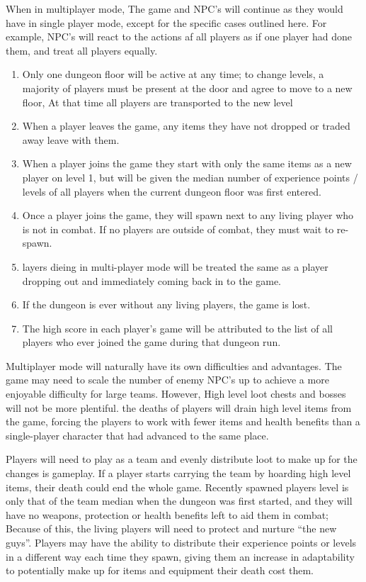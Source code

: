 \documentclass[12pt]{report}
\begin{document}
When in multiplayer mode, The game and NPC's will continue as they would have in single player mode, 
except for the specific cases outlined here. For example, 
NPC's will react to the actions af all players as if one player had done them,
and treat all players equally.
\begin{enumerate}
	\item Only one dungeon floor will be active at any time; to change levels, 
	a majority of players must be present at the door and agree to move to a new floor,
	At that time all players are transported to the new level
	
	\item When a player leaves the game, any items they have not dropped or traded away leave with them.
	
	\item When a player joins the game they start with only the same items as a new player on level 1, 
	but will be given the median number of experience points / levels of all players when the current
	dungeon floor was first entered.
	
	\item Once a player joins the game, they will spawn next to any living player who is not in combat. 
	If no players are outside of combat, they must wait to re-spawn.
	
	\item layers dieing in multi-player mode will be treated the same as a player dropping out 
	and immediately coming back in to the game.
	
	\item If the dungeon is ever without any living players, the game is lost.
	
	\item The high score in each player's game will be attributed to the list of all players 
	who ever joined the game during that dungeon run.
\end{enumerate}
Multiplayer mode will naturally have its own difficulties and advantages. 
The game may need to scale the number of enemy NPC's up to achieve a more enjoyable difficulty for large teams.
However, High level loot chests and bosses will not be more plentiful. 
the deaths of players will drain high level items from the game, forcing the players to work with fewer items and 
health benefits than a single-player character that had advanced to the same place.

Players will need to play as a team and evenly distribute loot to make up for the changes is gameplay.
If a player starts carrying the team by hoarding high level items, their death could end the whole game.
Recently spawned players level is only that of the team median when the dungeon was first started, 
and they will have no weapons, protection or
health benefits left to aid them in combat; Because of this, 
the living players will need to protect and nurture ``the new guys''.
Players may have the ability to distribute their experience points or levels in a different way each time they spawn,
giving them an increase in adaptability to potentially make up for items and equipment their death cost them.
\end{document}
